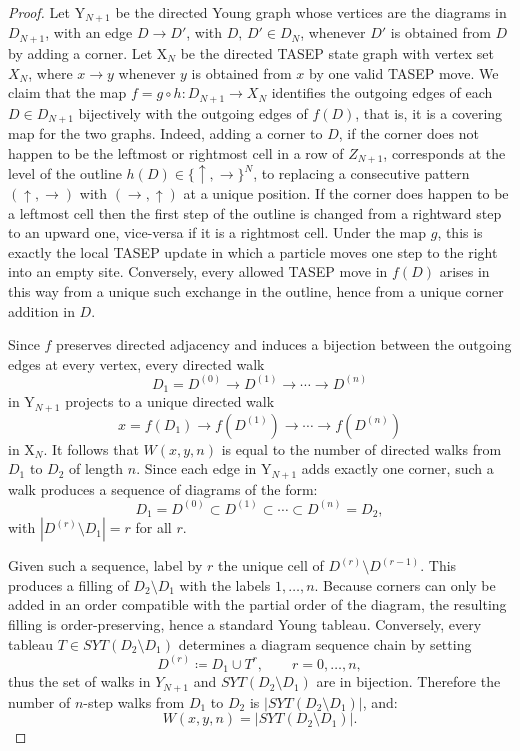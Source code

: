 \documentclass{article}
\begin{document}
\begin{proof}
    Let \(\mathrm{Y}_{N+1}\) be the directed Young graph whose vertices are the diagrams in \(D_{N+1}\), with an edge \(D\to D'\), with $D,\,D'\in D_N$, whenever \(D'\) is obtained from \(D\) by adding a corner. Let \(\mathrm{X}_N\) be the directed TASEP state graph with vertex set \(X_N\), where \(x\to y\) whenever \(y\) is obtained from \(x\) by one valid TASEP move. We claim that the map \(f=g\circ h\colon D_{N+1}\to X_N\) identifies the outgoing edges of each \(D\in D_{N+1}\) bijectively with the outgoing edges of \(f(D)\), that is, it is a covering map for the two graphs. Indeed, adding a corner to \(D\), if the corner does not happen to be the leftmost or rightmost cell in a row of $Z_{N+1}$, corresponds at the level of the outline \(h(D)\in\{\uparrow,\to\}^N\), to replacing a consecutive pattern \((\uparrow,\to)\) with \((\to,\uparrow)\) at a unique position. If the corner does happen to be a leftmost cell then the first step of the outline is changed from a rightward step to an upward one, vice-versa if it is a rightmost cell. Under the map \(g\), this is exactly the local TASEP update in which a particle moves one step to the right into an empty site. Conversely, every allowed TASEP move in \(f(D)\) arises in this way from a unique such exchange in the outline, hence from a unique corner addition in \(D\).

    Since \(f\) preserves directed adjacency and induces a bijection between the outgoing edges at every vertex, every directed walk
    \[
        D_1=D^{(0)}\to D^{(1)}\to\cdots\to D^{(n)}
    \]
    in \(\mathrm{Y}_{N+1}\) projects to a unique directed walk
    \[
        x=f(D_1)\to f(D^{(1)})\to\cdots\to f(D^{(n)})
    \]
    in \(\mathrm{X}_N\). It follows that \(W(x,y,n)\) is equal to the number of directed walks from \(D_1\) to \(D_2\) of length \(n\). Since each edge in \(\mathrm{Y}_{N+1}\) adds exactly one corner, such a walk produces a sequence of diagrams of the form:
    \[
        D_1=D^{(0)}\subset D^{(1)}\subset\cdots\subset D^{(n)}=D_2,
    \]
    with \(|D^{(r)}\setminus D_1|=r\) for all \(r\).

    Given such a sequence, label by \(r\) the unique cell of \(D^{(r)}\setminus D^{(r-1)}\). This produces a filling of \(D_2\setminus D_1\) with the labels \(1,\dots,n\). Because corners can only be added in an order compatible with the partial order of the diagram, the resulting filling is order-preserving, hence a standard Young tableau. Conversely, every tableau \(T\in SYT(D_2\setminus D_1)\) determines a diagram sequence chain by setting
    \[
        D^{(r)}\coloneqq D_1\cup T^r,\qquad r=0,\dots,n,
    \]
    thus the set of walks in $Y_{N+1}$ and $SYT(D_2\setminus D_1)$ are in bijection. 
    Therefore the number of \(n\)-step walks from \(D_1\) to \(D_2\) is \(|SYT(D_2\setminus D_1)|\), and:
    \[
        W(x,y,n)=|SYT(D_2\setminus D_1)|.
    \]
\end{proof}
\end{document}
